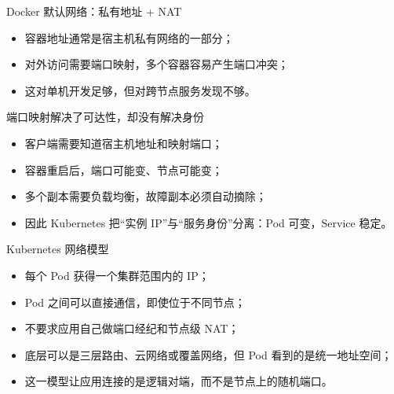 \documentclass[UTF8,fontset=none,aspectratio=169,10pt]{beamer}
\begin{document}
\begin{frame}{Docker 默认网络：私有地址 + NAT}
\begin{center}
\end{center}
\begin{itemize}
  \item 容器地址通常是宿主机私有网络的一部分；
  \item 对外访问需要端口映射，多个容器容易产生端口冲突；
  \item 这对单机开发足够，但对跨节点服务发现不够。
\end{itemize}
\end{frame}

\begin{frame}{端口映射解决了可达性，却没有解决身份}
\begin{itemize}
  \item 客户端需要知道宿主机地址和映射端口；
  \item 容器重启后，端口可能变、节点可能变；
  \item 多个副本需要负载均衡，故障副本必须自动摘除；
  \item 因此 Kubernetes 把“实例 IP”与“服务身份”分离：Pod 可变，Service 稳定。
\end{itemize}
\vfill
{}
\end{frame}

\begin{frame}{Kubernetes 网络模型}
\begin{itemize}
  \item 每个 Pod 获得一个集群范围内的 IP；
  \item Pod 之间可以直接通信，即使位于不同节点；
  \item 不要求应用自己做端口经纪和节点级 NAT；
  \item 底层可以是三层路由、云网络或覆盖网络，但 Pod 看到的是统一地址空间；
  \item 这一模型让应用连接的是逻辑对端，而不是节点上的随机端口。
\end{itemize}
\vfill
{}
\end{frame}
\end{document}
